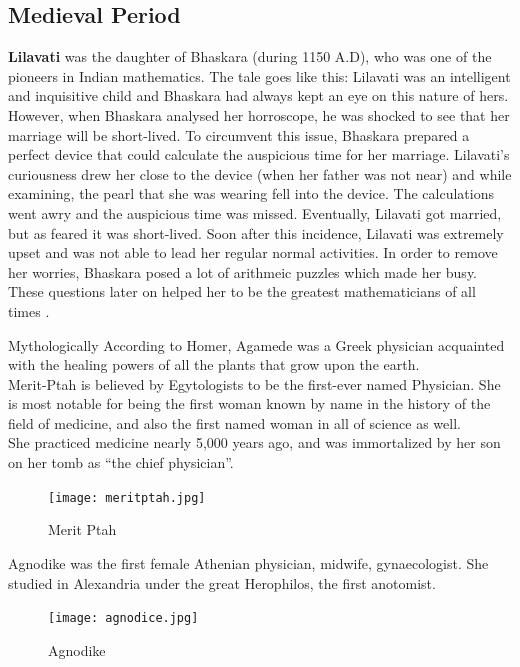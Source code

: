 \documentclass[a4paper,10pt]{article}
\begin{document}
\subsection{Medieval Period}
\textbf{Lilavati} was the daughter of Bhaskara (during 1150 A.D), who was one of the pioneers in Indian mathematics. The tale goes like this: Lilavati was an intelligent and inquisitive child and Bhaskara had always kept an eye on this nature of hers. However, when Bhaskara analysed her horroscope, he was shocked to see that her marriage will be short-lived. To circumvent this issue, Bhaskara prepared a perfect device that could calculate the auspicious time for her marriage. Lilavati's curiousness drew her close to the device (when her father was not near) and while examining, the pearl that she was wearing fell into the device. The calculations went awry and the auspicious time was missed. Eventually, Lilavati got married, but as feared it was short-lived. Soon after this incidence, Lilavati was extremely upset and was not able to lead her regular normal activities. In order to remove her worries, Bhaskara posed a lot of arithmeic puzzles which made her busy. These questions later on helped her to be the 
greatest mathematicians of all times \cite{lilavati}.  

\newblock
Mythologically According to Homer, Agamede was a Greek physician acquainted with the healing powers of all the plants that grow upon the earth.\\


\newblock
Merit-Ptah is believed by Egytologists to be the first-ever named Physician. She is most notable for being the first woman known by name in the history of the field of medicine, and also the first named woman in all of science as well.\\

She practiced medicine nearly 5,000 years ago, and was immortalized by her son on her tomb as “the chief physician”\cite{merit}.
\begin{center}
\begin{figure}[h]
\centering
 \texttt{[image: meritptah.jpg]}
 \caption{Merit Ptah}
\end{figure}
\end{center}

\newblock
Agnodike was the first female Athenian physician, midwife, gynaecologist. She studied in Alexandria under the great Herophilos, the first anotomist.

\begin{center}
\begin{figure}[h]
\centering
 \texttt{[image: agnodice.jpg]}
 \caption{Agnodike}
\end{figure}
\end{center}
\end{document}
